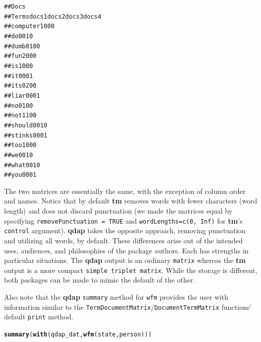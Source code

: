 \documentclass{article}\usepackage[]{graphicx}\usepackage[]{color}
\makeatletter
\newcommand{\hlstd}[1]{\textcolor[rgb]{0.345,0.345,0.345}{#1}}%
\newcommand{\hlkwd}[1]{\textcolor[rgb]{0.737,0.353,0.396}{\textbf{#1}}}%
\newenvironment{kframe}{%
 \def\at@end@of@kframe{}%
 \ifinner\ifhmode%
  \def\at@end@of@kframe{\end{minipage}}%
  \begin{minipage}{\columnwidth}%
 \fi\fi%
 \def\FrameCommand##1{\hskip\@totalleftmargin \hskip-\fboxsep
 \colorbox{shadecolor}{##1}\hskip-\fboxsep
     \hskip-\linewidth \hskip-\@totalleftmargin \hskip\columnwidth}%
 \MakeFramed {\advance\hsize-\width
   \@totalleftmargin\z@ \linewidth\hsize
   \@setminipage}}%
 {\par\unskip\endMakeFramed%
 \at@end@of@kframe}
\newenvironment{knitrout}{}{} %
\makeatother
\begin{document}
\begin{knitrout}
\color{fgcolor}\begin{kframe}
\begin{alltt}
##           Docs
## Terms      docs 1 docs 2 docs 3 docs 4
##   computer      1      0      0      0
##   do            0      0      1      0
##   dumb          0      1      0      0
##   fun           2      0      0      0
##   is            1      0      0      0
##   it            0      0      0      1
##   its           0      2      0      0
##   liar          0      0      0      1
##   no            0      1      0      0
##   not           1      1      0      0
##   should        0      0      1      0
##   stinks        0      0      0      1
##   too           1      0      0      0
##   we            0      0      1      0
##   what          0      0      1      0
##   you           0      0      0      1
\end{alltt}
\end{kframe}
\end{knitrout}

The two matrices are essentially the same, with the exception of column order and names.  Notice that by default \textbf{tm} removes words with fewer characters (word length) and does not discard punctuation (we made the matrices equal by specifying \texttt{removePunctuation = TRUE} and \texttt{wordLengths=c(0, Inf)} for \textbf{tm}'s \texttt{control} argument).  \textbf{qdap} takes the opposite approach, removing punctuation and utilizing all words, by default.  These differences arise out of the intended uses, audiences, and philosophies of the package authors.  Each has strengths in particular situations.  The \textbf{qdap} output is an ordinary \texttt{matrix} whereas the \textbf{tm} output is a more compact \texttt{simple triplet matrix}.  While the storage is different, both packages can be made to mimic the default of the other.  

Also note that the \textbf{qdap} \texttt{summary} method for \texttt{wfm} provides the user with information similar to the \texttt{TermDocumentMatrix}/\texttt{DocumentTermMatrix} functions' default \texttt{print} method.


\begin{knitrout}
\color{fgcolor}\begin{kframe}
\begin{alltt}
\hlkwd{summary}\hlstd{(}\hlkwd{with}\hlstd{(qdap_dat,} \hlkwd{wfm}\hlstd{(state, person)))}
\end{alltt}
\end{kframe}
\end{knitrout}
\end{document}
